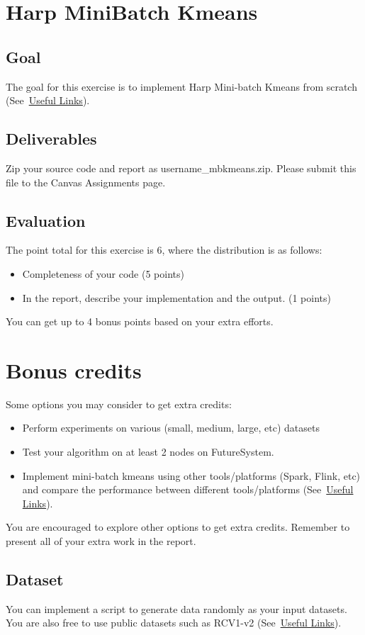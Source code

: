 \section*{Harp Mini\-Batch Kmeans}
\subsection*{Goal}
The goal for this exercise is to implement Harp Mini-batch Kmeans
from scratch (See~\hyperlink{link_project8}{Useful Links}). 

\subsection*{Deliverables}
Zip your source code and report as username\_mbkmeans.zip. Please submit this
file to the Canvas Assignments page.

\subsection*{Evaluation}

The point total for this exercise is 6, where the distribution is as follows:
\begin{itemize}
\item Completeness of your code (5 points)
\item In the report, describe your implementation and the output. (1 points)
\end{itemize}
 You can get up to 4 bonus points based on your  extra efforts.
\section*{Bonus credits}

Some options you may consider to get extra credits: 
\begin{itemize}
\item Perform experiments on various (small, medium, large, etc) datasets 
\item Test your algorithm on at least 2 nodes on FutureSystem.
\item Implement mini-batch kmeans using other tools/platforms
  (Spark, Flink, etc) and compare the performance between different
    tools/platforms (See~\hyperlink{link_project8}{Useful Links}).
\end{itemize}
You are encouraged to explore other options to get extra credits. Remember to
present all of your extra work in the report.
 
\subsection*{Dataset}
You can implement a script to  generate data randomly as your input datasets.
You are also free to use public datasets such as RCV1-v2
(See~\hyperlink{link_project8}{Useful Links}).
  
